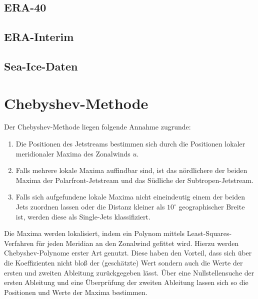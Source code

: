 \subsection{ERA-40}
\citep{uppala-2005}
\subsection{ERA-Interim}
\citep{dee-2011}
\subsection{Sea-Ice-Daten}
\citep{sii-2016}

\section{Chebyshev-Methode}
Der Chebyshev-Methode liegen folgende Annahme zugrunde:
\begin{enumerate}
  \item Die Positionen des Jetstreams bestimmen sich durch die Positionen lokaler meridionaler Maxima des Zonalwinds $u$.
  \item Falls mehrere lokale Maxima auffindbar sind, ist das nördlichere der beiden Maxima der Polarfront-Jetstream und das Südliche der Subtropen-Jetstream.
  \item Falls sich aufgefundene lokale Maxima nicht eineindeutig einem der beiden Jets zuordnen lassen oder die Distanz kleiner als $10^\circ$ geographischer Breite ist, werden diese als Single-Jets klassifiziert.
\end{enumerate}
Die Maxima werden lokalisiert, indem ein Polynom mittels Least-Squares-Verfahren für jeden Meridian an den Zonalwind gefittet wird. Hierzu werden Chebyshev-Polynome erster Art genutzt. Diese haben den Vorteil, dass sich über die Koeffizienten nicht bloß der (geschätzte) Wert sondern auch die Werte der ersten und zweiten Ableitung zurückgegeben lässt. Über eine Nullstellensuche der ersten Ableitung und eine Überprüfung der zweiten Ableitung lassen sich so die Positionen und Werte der Maxima bestimmen.

